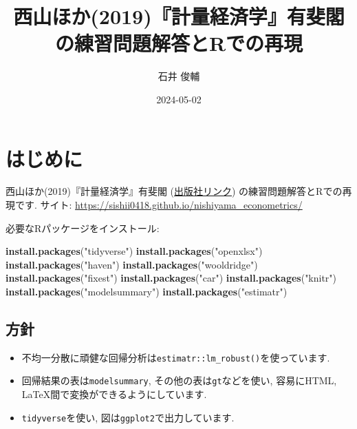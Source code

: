 \documentclass[
]{book}
\title{西山ほか(2019)『計量経済学』有斐閣の練習問題解答とRでの再現}
\author{石井 俊輔}
\date{2024-05-02}
\newenvironment{Shaded}{\begin{snugshade}}{\end{snugshade}}
\newcommand{\FunctionTok}[1]{\textcolor[rgb]{0.13,0.29,0.53}{\textbf{#1}}}
\newcommand{\NormalTok}[1]{#1}
\newcommand{\StringTok}[1]{\textcolor[rgb]{0.31,0.60,0.02}{#1}}
\providecommand{\tightlist}{%
  \setlength{\itemsep}{0pt}\setlength{\parskip}{0pt}}
\begin{document}
\maketitle

{
\setcounter{tocdepth}{1}
\tableofcontents
}
\hypertarget{ux306fux3058ux3081ux306b}{%
\chapter*{はじめに}\label{ux306fux3058ux3081ux306b}}

西山ほか(2019)『計量経済学』有斐閣 (\href{https://www.yuhikaku.co.jp/books/detail/9784641053854}{出版社リンク}) の練習問題解答とRでの再現です.
サイト: \url{https://sishii0418.github.io/nishiyama_econometrics/}

必要なRパッケージをインストール:

\begin{Shaded}
\begin{Highlighting}[]
\FunctionTok{install.packages}\NormalTok{(}\StringTok{"tidyverse"}\NormalTok{)}
\FunctionTok{install.packages}\NormalTok{(}\StringTok{"openxlsx"}\NormalTok{)}
\FunctionTok{install.packages}\NormalTok{(}\StringTok{"haven"}\NormalTok{)}
\FunctionTok{install.packages}\NormalTok{(}\StringTok{"wooldridge"}\NormalTok{)}
\FunctionTok{install.packages}\NormalTok{(}\StringTok{"fixest"}\NormalTok{)}
\FunctionTok{install.packages}\NormalTok{(}\StringTok{"car"}\NormalTok{)}
\FunctionTok{install.packages}\NormalTok{(}\StringTok{"knitr"}\NormalTok{)}
\FunctionTok{install.packages}\NormalTok{(}\StringTok{"modelsummary"}\NormalTok{)}
\FunctionTok{install.packages}\NormalTok{(}\StringTok{"estimatr"}\NormalTok{)}
\end{Highlighting}
\end{Shaded}

\hypertarget{ux65b9ux91dd}{%
\section*{方針}\label{ux65b9ux91dd}}

\begin{itemize}
\tightlist
\item
  不均一分散に頑健な回帰分析は\texttt{estimatr::lm\_robust()}を使っています.
\item
  回帰結果の表は\texttt{modelsummary}, その他の表は\texttt{gt}などを使い, 容易にHTML, LaTeX間で変換ができるようにしています.
\item
  \texttt{tidyverse}を使い, 図は\texttt{ggplot2}で出力しています.
\end{itemize}
\end{document}

